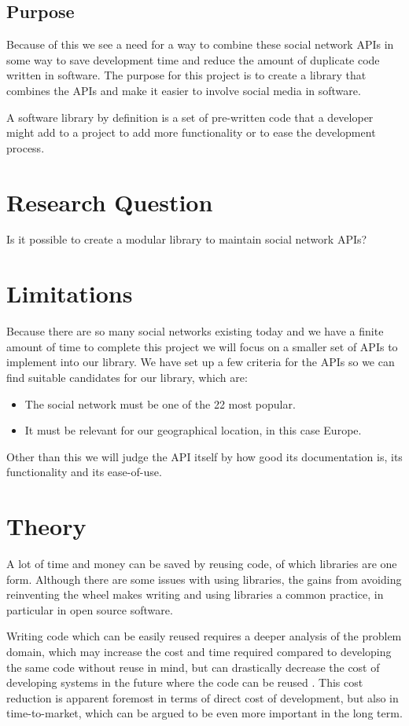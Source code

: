 \documentclass{sigchi-alternate}
\begin{document}
\subsection{Purpose}
Because of this we see a need for a way to combine these social network APIs in some way to save development
time and reduce the amount of duplicate code written in software. The purpose for this project is to create a library that combines the APIs and
make it easier to involve social media in software.

A software library by definition is a set of pre-written code that a developer might add to a project to add more functionality or to ease the
development process\cite{TLDP_LIBRARY_DEFINITION}.

\section{Research Question}
Is it possible to create a modular library to maintain social network APIs?

\section{Limitations}
Because there are so many social networks existing today and we have a finite amount of time to complete this
 project we will focus on a smaller set of APIs to implement into our library.  We have set up a few criteria
 for the APIs so we can find suitable candidates for our library, which are:
\begin{itemize}
	\item The social network must be one of the 22 most popular\cite{STATISTA_LEADING_SOCIAL_NETWORKS}.
	\item It must be relevant for our geographical location, in this case Europe.
\end{itemize}
Other than this we will judge the API itself by how good its documentation is, its functionality and its ease-of-use.

\section{Theory}
A lot of time and money can be saved by reusing code, of which libraries are one form. Although there are
some issues with using libraries, the gains from avoiding reinventing the wheel makes writing and using
libraries a common practice, in particular in open source software\cite{2998479020080101}.

Writing code which can be easily reused requires a deeper analysis of the problem domain, which may increase the cost and time required compared
to developing the same code without reuse in mind, but can drastically decrease the cost of developing systems in the future where the code can
be reused \cite{lim1994effects}. This cost reduction is apparent foremost in terms of direct cost of development, but also in time-to-market,
which can be argued to be even more important in the long term\cite{griss1993software}.
\end{document}
